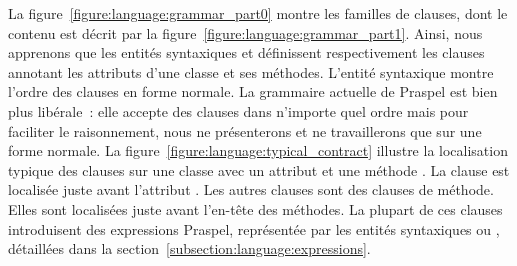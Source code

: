 La figure~\ref{figure:language:grammar_part0} montre les familles de clauses,
dont le contenu est décrit par la figure~\ref{figure:language:grammar_part1}.
Ainsi, nous apprenons que les entités syntaxiques  et
 définissent respectivement les clauses annotant les
attributs d'une classe et ses méthodes.  L'entité syntaxique
 montre l'ordre des clauses en forme normale. La grammaire
actuelle de Praspel est bien plus libérale~: elle accepte des clauses dans
n'importe quel ordre mais pour faciliter le raisonnement, nous ne présenterons
et ne travaillerons que sur une forme normale. La
figure~\ref{figure:language:typical_contract} illustre la localisation typique
des clauses sur une classe  avec un attribut  et une méthode
. La clause \ainvariant est localisée juste avant l'attribut .
Les autres clauses sont des clauses de méthode.  Elles sont localisées juste
avant l'en-tête des méthodes. La plupart de ces clauses introduisent des
expressions Praspel, représentée par les entités syntaxiques 
ou , détaillées dans la
section~\ref{subsection:language:expressions}.

